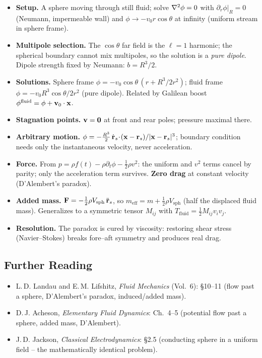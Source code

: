\documentclass[../main.tex]{subfiles}
\begin{document}
\begin{itemize}
  \item \textbf{Setup.} A sphere moving through still fluid; solve $\nabla^2\phi=0$ with $\partial_r\phi|_{R}=0$ (Neumann, impermeable wall) and $\phi\to-v_0 r\cos\theta$ at infinity (uniform stream in sphere frame).
  \item \textbf{Multipole selection.} The $\cos\theta$ far field is the $\ell=1$ harmonic; the spherical boundary cannot mix multipoles, so the solution is a \emph{pure dipole}. Dipole strength fixed by Neumann: $b=R^3/2$.
  \item \textbf{Solutions.} Sphere frame $\phi=-v_0\cos\theta\,(r+R^3/2r^2)$; fluid frame $\phi=-v_0R^3\cos\theta/2r^2$ (pure dipole). Related by Galilean boost $\phi^{\text{fluid}}=\phi+\mathbf{v}_0\cdot\mathbf{x}$.
  \item \textbf{Stagnation points.} $\mathbf{v}=\mathbf{0}$ at front and rear poles; pressure maximal there.
  \item \textbf{Arbitrary motion.} $\phi=-\tfrac{R^3}{2}\,\dot{\mathbf{r}}_s\!\cdot\!(\mathbf{x}-\mathbf{r}_s)/|\mathbf{x}-\mathbf{r}_s|^3$; boundary condition needs only the instantaneous velocity, never acceleration.
  \item \textbf{Force.} From $p=\rho f(t)-\rho\partial_t\phi-\tfrac12\rho v^2$: the uniform and $v^2$ terms cancel by parity; only the acceleration term survives. \textbf{Zero drag} at constant velocity (D'Alembert's paradox).
  \item \textbf{Added mass.} $\mathbf{F}=-\tfrac12\rho V_{\text{sph}}\,\ddot{\mathbf{r}}_s$, so $m_{\text{eff}}=m+\tfrac12\rho V_{\text{sph}}$ (half the displaced fluid mass). Generalizes to a symmetric tensor $M_{ij}$ with $T_{\text{fluid}}=\tfrac12 M_{ij}v_iv_j$.
  \item \textbf{Resolution.} The paradox is cured by viscosity: restoring shear stress (Navier--Stokes) breaks fore--aft symmetry and produces real drag.
\end{itemize}

\subsection*{Further Reading}
\begin{itemize}
  \item L.\,D. Landau and E.\,M. Lifshitz, \textit{Fluid Mechanics} (Vol.\ 6): \S10--11 (flow past a sphere, D'Alembert's paradox, induced/added mass).
  \item D.\,J. Acheson, \textit{Elementary Fluid Dynamics}: Ch.\ 4--5 (potential flow past a sphere, added mass, D'Alembert).
  \item J.\,D. Jackson, \textit{Classical Electrodynamics}: \S2.5 (conducting sphere in a uniform field -- the mathematically identical problem).
\end{itemize}
\end{document}
